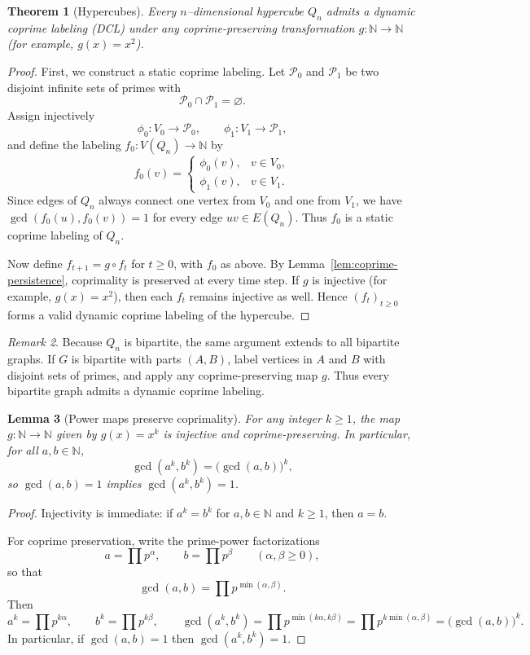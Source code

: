 \documentclass[12pt]{amsart}
\theoremstyle{plain}
\newtheorem{thm}{Theorem}[section]
\newtheorem{lemma}[thm]{Lemma}
\theoremstyle{definition}
\theoremstyle{remark}
\newtheorem{remark}[thm]{Remark}
\numberwithin{equation}{section}
\begin{document}
\begin{thm}[Hypercubes]\label{thm:hypercube}
Every $n$--dimensional hypercube $Q_n$ admits a dynamic coprime labeling (DCL) under any coprime-preserving transformation $g:\mathbb N\to\mathbb N$ (for example, $g(x)=x^2$).
\end{thm}

\begin{proof}
First, we construct a static coprime labeling. Let $\mathcal P_0$ and $\mathcal P_1$ be two disjoint infinite sets of primes with
\[
\mathcal P_0\cap\mathcal P_1=\varnothing.
\]
Assign injectively
\[
\phi_0:V_0\to \mathcal P_0, \qquad \phi_1:V_1\to \mathcal P_1,
\]
and define the labeling $f_0:V(Q_n)\to\mathbb N$ by
\[
f_0(v)=\begin{cases}
\phi_0(v), & v\in V_0,\\[3pt]
\phi_1(v), & v\in V_1.
\end{cases}
\]
Since edges of $Q_n$ always connect one vertex from $V_0$ and one from $V_1$, we have $\gcd(f_0(u),f_0(v))=1$ for every edge $uv\in E(Q_n)$. Thus $f_0$ is a static coprime labeling of $Q_n$.

Now define $f_{t+1}=g\circ f_t$ for $t\ge0$, with $f_0$ as above. By Lemma~\ref{lem:coprime-persistence}, coprimality is preserved at every time step. If $g$ is injective (for example, $g(x)=x^2$), then each $f_t$ remains injective as well. Hence $(f_t)_{t\ge 0}$ forms a valid dynamic coprime labeling of the hypercube.
\end{proof}

\begin{remark}
Because $Q_n$ is bipartite, the same argument extends to all bipartite graphs. If $G$ is bipartite with parts $(A,B)$, label vertices in $A$ and $B$ with disjoint sets of primes, and apply any coprime-preserving map $g$. Thus every bipartite graph admits a dynamic coprime labeling.
\end{remark}

\begin{lemma}[Power maps preserve coprimality]\label{lem:power-coprime}
For any integer $k\ge 1$, the map $g:\mathbb{N}\to\mathbb{N}$ given by $g(x)=x^k$ is injective and coprime-preserving. In particular, for all $a,b\in\mathbb{N}$,
\[
\gcd(a^k,b^k)=\bigl(\gcd(a,b)\bigr)^{k},
\]
so $\gcd(a,b)=1$ implies $\gcd(a^k,b^k)=1$.
\end{lemma}

\begin{proof}
Injectivity is immediate: if $a^k=b^k$ for $a,b\in\mathbb{N}$ and $k\ge 1$, then $a=b$.

For coprime preservation, write the prime-power factorizations
\[
a=\prod p^{\alpha},\qquad b=\prod p^{\beta}\qquad(\alpha,\beta\ge 0),
\]
so that
\[
\gcd(a,b)=\prod p^{\min(\alpha,\beta)}.
\]
Then
\[
a^k=\prod p^{k\alpha},\qquad b^k=\prod p^{k\beta},\qquad
\gcd(a^k,b^k)=\prod p^{\min(k\alpha,k\beta)}=\prod p^{k\min(\alpha,\beta)}=\bigl(\gcd(a,b)\bigr)^k.
\]
In particular, if $\gcd(a,b)=1$ then $\gcd(a^k,b^k)=1$.
\end{proof}
\end{document}

